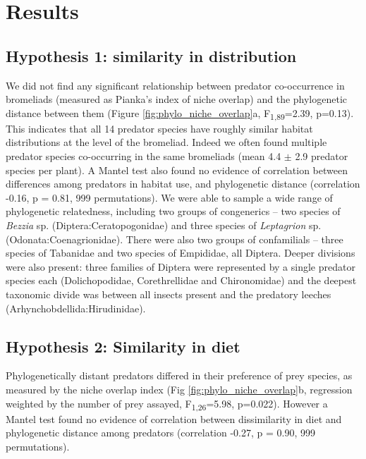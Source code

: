 \section{Results}\label{results}

\subsection{Hypothesis 1: similarity in
distribution}\label{hypothesis-1-similarity-in-distribution}

We did not find any significant relationship between predator
co-occurrence in bromeliads (measured as Pianka's index of niche
overlap) and the phylogenetic distance between them (Figure \ref{fig:phylo_niche_overlap}a,
F\textsubscript{1,89}=2.39, p=0.13). This indicates that all 14 predator
species have roughly similar habitat distributions at the level of the
bromeliad. Indeed we often found multiple predator species co-occurring
in the same bromeliads (mean 4.4 $\pm$ 2.9 predator species per plant). A
Mantel test also found no evidence of correlation between differences
among predators in habitat use, and phylogenetic distance (correlation
-0.16, p = 0.81, 999 permutations). We were able to sample a wide range
of phylogenetic relatedness, including two groups of congenerics -- two
species of \emph{Bezzia} sp. (Diptera:Ceratopogonidae) and three species
of \emph{Leptagrion} sp. (Odonata:Coenagrionidae). There were also two
groups of confamilials -- three species of Tabanidae and two species of
Empididae, all Diptera. Deeper divisions were also present: three
families of Diptera were represented by a single predator species each
(Dolichopodidae, Corethrellidae and Chironomidae) and the deepest
taxonomic divide was between all insects present and the predatory
leeches (Arhynchobdellida:Hirudinidae).

\subsection{Hypothesis 2: Similarity in
diet}\label{hypothesis-2-similarity-in-diet}

Phylogenetically distant predators differed in their preference of prey
species, as measured by the niche overlap index (Fig \ref{fig:phylo_niche_overlap}b, regression
weighted by the number of prey assayed, F\textsubscript{1,26}=5.98,
p=0.022). However a Mantel test found no evidence of correlation between
dissimilarity in diet and phylogenetic distance among predators
(correlation -0.27, p = 0.90, 999 permutations).

